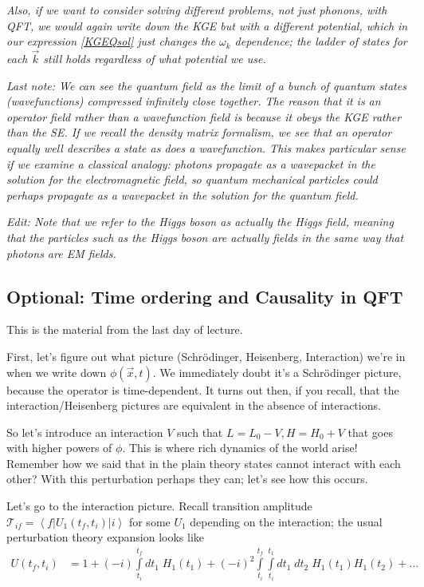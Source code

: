 \documentclass[12pt]{article}
\newcommand{\bra}[1]{\left<#1\right|}
\newcommand{\ket}[1]{\left|#1\right>}
\begin{document}
{\em \small Also, if we want to consider solving different problems, not just phonons, with QFT, we would again write down the KGE but with a different potential, which in our expression \eqref{KGEQsol} just changes the $\omega_k$ dependence; the ladder of states for each $\vec{k}$ still holds regardless of what potential we use.}

{\em \small Last note: We can see the quantum field as the limit of a bunch of quantum states (wavefunctions) compressed infinitely close together. The reason that it is an operator field rather than a wavefunction field is because it obeys the KGE rather than the SE. If we recall the density matrix formalism, we see that an operator equally well describes a state as does a wavefunction. This makes particular sense if we examine a classical analogy: photons propagate as a wavepacket in the solution for the electromagnetic field, so quantum mechanical particles could perhaps propagate as a wavepacket in the solution for the quantum field.}

{\em \small Edit: Note that we refer to the Higgs boson as actually the Higgs field, meaning that the particles such as the Higgs boson are actually fields in the same way that photons are EM fields.}

\subsection{Optional: Time ordering and Causality in QFT}

This is the material from the last day of lecture.

First, let's figure out what picture (Schr\"odinger, Heisenberg, Interaction) we're in when we write down $\phi(\vec{x},t)$. We immediately doubt it's a Schr\"odinger picture, because the operator is time-dependent. It turns out then, if you recall, that the interaction/Heisenberg pictures are equivalent in the absence of interactions.

So let's introduce an interaction $V$ such that $L = L_0 - V, H = H_0 + V$ that goes with higher powers of $\phi$. This is where rich dynamics of the world arise! Remember how we said that in the plain theory states cannot interact with each other? With this perturbation perhaps they can; let's see how this occurs. 

Let's go to the interaction picture. Recall transition amplitude $\mathcal{T}_{if} = \bra{f}U_1(t_f, t_i)\ket{i}$ for some $U_1$ depending on the interaction; the usual perturbation theory expansion looks like
\begin{align}
    U(t_f,t_i) &= 1 + (-i)\int\limits_{t_i}^{t_f}dt_1\;H_1(t_1) + (-i)^2 \int\limits_{t_i}^{t_f}\int\limits_{t_{i}}^{t_1}dt_1\;dt_2\;H_1(t_1)H_1(t_2) +\dots
\end{align}
\end{document}
